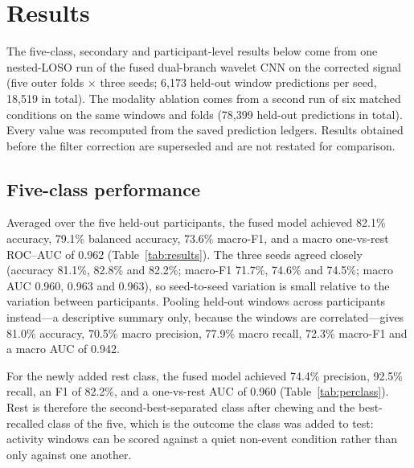 \documentclass[pdflatex,sn-nature,iicol]{sn-jnl}
\begin{document}
\section{Results}

The five-class, secondary and participant-level results below come from one nested-LOSO run of the fused dual-branch wavelet CNN on the corrected signal (five outer folds $\times$ three seeds; 6,173 held-out window predictions per seed, 18,519 in total). The modality ablation comes from a second run of six matched conditions on the same windows and folds (78,399 held-out predictions in total). Every value was recomputed from the saved prediction ledgers. Results obtained before the filter correction are superseded and are not restated for comparison.

\subsection{Five-class performance}

Averaged over the five held-out participants, the fused model achieved 82.1\% accuracy, 79.1\% balanced accuracy, 73.6\% macro-F1, and a macro one-vs-rest ROC--AUC of 0.962 (Table~\ref{tab:results}). The three seeds agreed closely (accuracy 81.1\%, 82.8\% and 82.2\%; macro-F1 71.7\%, 74.6\% and 74.5\%; macro AUC 0.960, 0.963 and 0.963), so seed-to-seed variation is small relative to the variation between participants. Pooling held-out windows across participants instead---a descriptive summary only, because the windows are correlated---gives 81.0\% accuracy, 70.5\% macro precision, 77.9\% macro recall, 72.3\% macro-F1 and a macro AUC of 0.942.

For the newly added rest class, the fused model achieved 74.4\% precision, 92.5\% recall, an F1 of 82.2\%, and a one-vs-rest AUC of 0.960 (Table~\ref{tab:perclass}). Rest is therefore the second-best-separated class after chewing and the best-recalled class of the five, which is the outcome the class was added to test: activity windows can be scored against a quiet non-event condition rather than only against one another.
\end{document}
